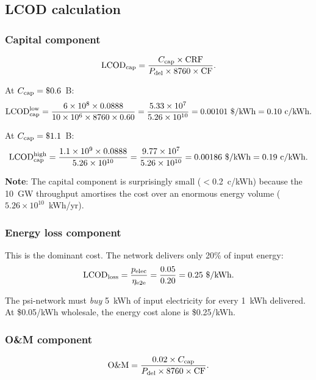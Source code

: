 \documentclass[11pt]{article}
\newcommand{\ee}[1]{\times 10^{#1}}
\begin{document}
\subsection{LCOD calculation}

\subsubsection{Capital component}
\begin{equation}
\text{LCOD}_{\rm cap} = \frac{C_{\rm cap}\times\text{CRF}}{P_{\rm del}
\times 8760\times\text{CF}}.
\end{equation}

At $C_{\rm cap} = \$0.6$~B:
\begin{equation}
\text{LCOD}_{\rm cap}^{\rm low} = \frac{6\ee{8}\times 0.0888}
{10\ee{6}\times 8760\times 0.60}
= \frac{5.33\ee{7}}{5.26\ee{10}}
= 0.00101~\$/\text{kWh}
= 0.10~\text{c/kWh}.
\end{equation}

At $C_{\rm cap} = \$1.1$~B:
\begin{equation}
\text{LCOD}_{\rm cap}^{\rm high} = \frac{1.1\ee{9}\times 0.0888}
{5.26\ee{10}}
= \frac{9.77\ee{7}}{5.26\ee{10}}
= 0.00186~\$/\text{kWh}
= 0.19~\text{c/kWh}.
\end{equation}

\textbf{Note}: The capital component is surprisingly small ($<$0.2~c/kWh)
because the 10~GW throughput amortises the cost over an enormous energy
volume ($5.26\ee{10}$~kWh/yr).

\subsubsection{Energy loss component}

This is the dominant cost. The network delivers only 20\% of input energy:
\begin{equation}
\text{LCOD}_{\rm loss} = \frac{p_{\rm elec}}{\eta_{\rm e2e}}
= \frac{0.05}{0.20} = 0.25~\$/\text{kWh}.
\end{equation}

The psi-network must \emph{buy} 5~kWh of input electricity for every
1~kWh delivered. At \$0.05/kWh wholesale, the energy cost alone is
\$0.25/kWh.

\subsubsection{O\&M component}
\begin{equation}
\text{O\&M} = \frac{0.02\times C_{\rm cap}}{P_{\rm del}\times 8760\times\text{CF}}.
\end{equation}
\end{document}
